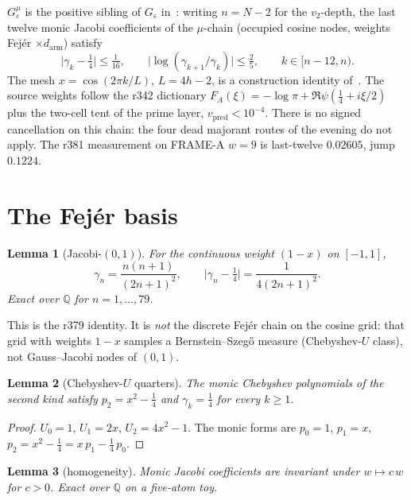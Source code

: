 \documentclass[11pt]{article}
\newtheorem{lemma}{Lemma}
\theoremstyle{remark}
\newcommand{\Q}{\mathbb{Q}}
\begin{document}
$G_\varepsilon^\mu$ is the positive sibling of $G_\varepsilon$
in~\cite{geps}: writing $n=N-2$ for the $v_2$-depth, the last
twelve monic Jacobi coefficients of the $\mu$-chain (occupied
cosine nodes, weights Fej\'er $\times d_{\mathrm{arm}}$) satisfy
\begin{equation}\label{eq:gepsmu}
\bigl\lvert\gamma_k-\tfrac14\bigr\rvert\le\tfrac1{16},
\qquad
\bigl\lvert\log(\gamma_{k+1}/\gamma_k)\bigr\rvert\le\tfrac25,
\qquad
k\in[n-12,n).
\end{equation}
The mesh $x=\cos(2\pi k/L)$, $L=4h-2$, is a construction identity
of~\cite{v3p}.
The source weights follow the r342 dictionary
$F_A(\xi)=-\log\pi+\Re\psi(\tfrac14+i\xi/2)$ plus the two-cell tent
of the prime layer, $v_{\mathrm{pred}}<10^{-4}$.
There is no signed cancellation on this chain: the four dead
majorant routes of the evening do not apply.
The r381 measurement on FRAME-A $w=9$ is last-twelve $0.02605$,
jump $0.1224$.

\section{The Fej\'er basis}\label{sec:fejer}

\begin{lemma}[Jacobi-$(0,1)$]\label{lem:jac}
For the continuous weight $(1-x)$ on $[-1,1]$,
\[
\gamma_n=\frac{n(n+1)}{(2n+1)^2},
\qquad
\bigl\lvert\gamma_n-\tfrac14\bigr\rvert
=\frac{1}{4(2n+1)^2}.
\]
Exact over $\Q$ for $n=1,\ldots,79$.
\end{lemma}

This is the r379 identity.  It is \emph{not} the discrete Fej\'er
chain on the cosine grid: that grid with weights $1-x$ samples a
Bernstein--Szeg\H{o} measure (Chebyshev-$U$ class), not Gauss--Jacobi
nodes of $(0,1)$.

\begin{lemma}[Chebyshev-$U$ quarters]\label{lem:U}
The monic Chebyshev polynomials of the second kind satisfy
$p_2=x^2-\tfrac14$ and $\gamma_k=\tfrac14$ for every $k\ge 1$.
\end{lemma}

\begin{proof}
$U_0=1$, $U_1=2x$, $U_2=4x^2-1$.  The monic forms are
$p_0=1$, $p_1=x$, $p_2=x^2-\tfrac14=x\,p_1-\tfrac14\,p_0$.
\end{proof}

\begin{lemma}[homogeneity]\label{lem:hom}
Monic Jacobi coefficients are invariant under $w\mapsto c\,w$
for $c>0$.  Exact over $\Q$ on a five-atom toy.
\end{lemma}
\end{document}
